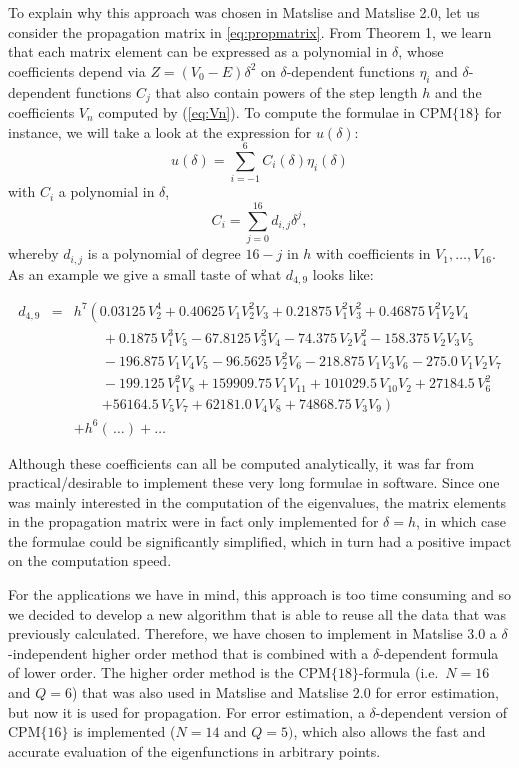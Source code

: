 To explain why this approach was chosen in Matslise and Matslise 2.0, let us consider the propagation matrix in \eqref{eq:propmatrix}. From Theorem 1, we learn that each matrix element can be expressed as a polynomial in $\delta$, whose coefficients depend
via $Z=(V_0-E) \delta^2$ on $\delta$-dependent functions $\eta_i$ and $\delta$-dependent functions $C_j$ that also contain powers of the step length $h$ and the coefficients $V_n$ computed by (\ref{eq:Vn}). To compute the formulae in $\text{CPM}\{18\}$ for instance, we will take a look at the expression for $u(\delta)$:
$$
    u(\delta) = \sum_{i = -1}^6 C_i(\delta) \eta_{i}(\delta)
$$
with $C_i$ a polynomial in $\delta$,
$$
    C_i  = \sum_{j=0}^{16} d_{i, j} \delta^j,
$$
whereby $d_{i, j}$ is a polynomial of degree $16-j$ in $h$ with coefficients in $V_1, \dots, V_{16}$. As an example we give a small taste of what $d_{4, 9}$ looks like:

\begin{eqnarray*}
    d_{4, 9}& =&  h^7 \left (0.03125 \, V_{2}^{4} + 0.40625 \, V_{1} V_{2}^{2} V_{3} + 0.21875 \, V_{1}^{2} V_{3}^{2} + 0.46875 \, V_{1}^{2} V_{2} V_{4} \right. \\
    &  & \qquad + 0.1875 \, V_{1}^{3} V_{5} - 67.8125 \, V_{3}^{2} V_{4} - 74.375 \, V_{2} V_{4}^{2} - 158.375 \, V_{2} V_{3} V_{5}         \\
    &  & \qquad - 196.875 \, V_{1} V_{4} V_{5} - 96.5625 \, V_{2}^{2} V_{6} - 218.875 \, V_{1} V_{3} V_{6} - 275.0 \, V_{1} V_{2} V_{7}     \\
    &  & \qquad - 199.125 \, V_{1}^{2} V_{8} + 159909.75 \, V_{1} V_{11} + 101029.5 \, V_{10} V_{2} + 27184.5 \, V_{6}^{2}                  \\
    &  & \qquad \left.+ 56164.5 \, V_{5} V_{7} + 62181.0 \, V_{4} V_{8} + 74868.75 \, V_{3} V_{9} \right)                                                 \\
    &  & + h^6 (\,\dots)  + \dots
\end{eqnarray*}


Although these coefficients can all be computed analytically, it was far from practical/desirable to implement these very long formulae in software. Since one was mainly interested in the computation of
the eigenvalues, the matrix elements in the propagation matrix were in fact only implemented for $\delta=h$, in which case the formulae could be significantly simplified, which in turn had a positive impact on the computation speed.

For the applications we have in mind, this approach is too time consuming and so we decided to develop a new algorithm that is able to reuse all the data that was previously calculated.
Therefore, we have chosen to implement in Matslise 3.0 a $\delta$-independent higher order method that is combined with a $\delta$-dependent formula of lower order.
The higher order method is the $\text{CPM}\{18\}$-formula (i.e.\ $N=16$ and $Q=6$) %
that was also used in Matslise and Matslise 2.0 for error estimation, but now it is used for propagation.
For error estimation, a $\delta$-dependent version of $\text{CPM}\{16\}$ is implemented ($N=14$ and $Q=5)$, which also allows the fast and accurate evaluation of the eigenfunctions in arbitrary points.


